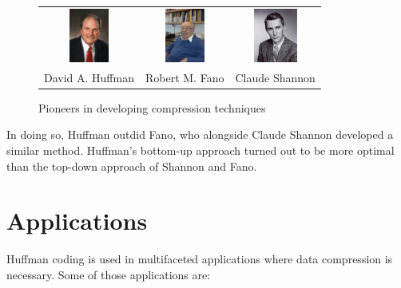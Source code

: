 \documentclass[18pt]{article}
\begin{document}
\begin{center}
	\begin{figure}[h]
	\centering
	\begin{tabular}{c c c}
		\includegraphics[height = 0.7in, width = 0.65in]{images/huffman.jpg} & 
		\includegraphics[height = 0.7in, width = 0.65in]{images/fano.jpg} & 
		\includegraphics[height = 0.7in, width = 0.65in]{images/shannon.jpg} \\
		\scriptsize{David A. Huffman} & \scriptsize{Robert M. Fano} & \scriptsize{Claude Shannon} \\
	\end{tabular} 
	\caption{Pioneers in developing compression techniques}
	\end{figure}   
\end{center}

In doing so, Huffman outdid Fano, who alongside Claude Shannon developed
a similar method. Huffman’s bottom-up approach turned out to be more
optimal than the top-down approach of Shannon and Fano.

\newpage

\section{Applications}

Huffman coding is used in multifaceted applications where data compression is necessary. Some of those applications are: 
\end{document}
